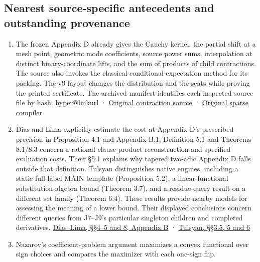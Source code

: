 \documentclass[11pt,a4paper]{article}
\makeatletter
\providecommand{\tightlist}{\setlength{\itemsep}{0pt}\setlength{\parskip}{0pt}}
\newcommand{\PaperSixCatalogue}[1]{\csname hyper@linkurl\endcsname{#1}{EVIDENCE_CATALOG.md}}
\newcommand{\PaperSixEvidence}[2]{\PaperSixCatalogue{#2}}
\makeatother
\begin{document}
\subsection{Nearest source-specific antecedents and outstanding
provenance}\label{v9-nearest-source-specific-antecedents-and-outstanding-provenance}

\begin{enumerate}
\def\labelenumi{\arabic{enumi}.}
\tightlist
\item
  The frozen Appendix D already gives the Cauchy kernel, the partial
  shift at a mesh point, geometric mode coefficients, source power sums,
  interpolation at distinct binary-coordinate lifts, and the sum of
  products of child contractions. The source also invokes the classical
  conditional-expectation method for its packing. The v9 layout changes
  the distribution and the seats while proving the printed certificate.
  The archived manifest identifies each inspected source file by hash.
  \PaperSixEvidence{evidence/research_work/sources/source_manifest.json}{Frozen
  manifest} ·
  \href{https://github.com/openai/math/blob/main/preprints/The-Exponential-Time-Hypothesis-is-False-October-25-2026/build/quantitative-contraction.tex}{Original
  contraction source} ·
  \href{https://github.com/openai/math/blob/main/preprints/The-Exponential-Time-Hypothesis-is-False-October-25-2026/build/quantitative-reduction.tex}{Original
  sparse compiler}
\item
  Dias and Lima explicitly estimate the cost at Appendix D's prescribed
  precision in Proposition 4.1 and Appendix B.1. Definition 5.1 and
  Theorems 8.1/8.3 concern a rational clause-product reconstruction and
  specified evaluation costs. Their §5.1 explains why tapered two-adic
  Appendix D falls outside that definition. Tulsyan distinguishes native
  engines, including a static full-label MAIN template (Proposition
  5.2), a linear-functional substitution-algebra bound (Theorem 3.7),
  and a residue-query result on a different set family (Theorem 6.4).
  These results provide nearby models for assessing the meaning of a
  lower bound. Their displayed conclusions concern different queries
  from J7--J9's particular singleton children and completed derivatives.
  \href{https://arxiv.org/html/2611.00517v1}{Dias--Lima, §§4--5 and 8,
  Appendix B} · \href{https://hexagonmath.org/pdf/2611.00149v1}{Tulsyan,
  §§3.5, 5 and 6}
\item
  Nazarov's coefficient-problem argument maximizes a convex functional
  over sign choices and compares the maximizer with each one-sign flip.

\end{enumerate}
\end{document}
